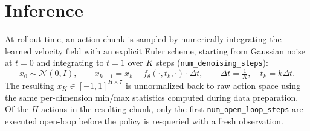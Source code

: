 \documentclass[11pt]{article}
\begin{document}
\section{Inference}

At rollout time, an action chunk is sampled by numerically integrating the learned velocity
field with an explicit Euler scheme, starting from Gaussian noise at $t=0$ and integrating to
$t=1$ over $K$ steps (\texttt{num\_denoising\_steps}):
\begin{equation}
    x_0 \sim \mathcal{N}(0, I), \qquad
    x_{k+1} = x_k + f_\theta(\cdot, t_k, \cdot) \cdot \Delta t, \qquad
    \Delta t = \tfrac{1}{K}, \quad t_k = k \Delta t.
\end{equation}
The resulting $x_K \in [-1,1]^{H \times 7}$ is unnormalized back to raw action space using the
same per-dimension min/max statistics computed during data preparation. Of the $H$ actions in
the resulting chunk, only the first \texttt{num\_open\_loop\_steps} are executed open-loop before
the policy is re-queried with a fresh observation.
\end{document}
